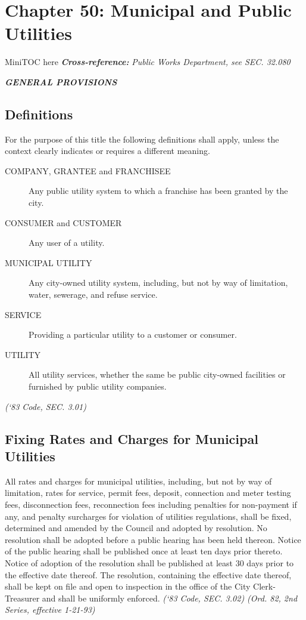 %
\chapter*{Chapter 50: \newline
	Municipal and Public Utilities}

MiniTOC here\newline
\textbf{\emph{{Cross-reference:}}}\newline
\emph{Public Works Department, see SEC. 32.080}
\pagebreak

\begin{center}
\textbf{\emph{\LARGE{GENERAL PROVISIONS}}}
\end{center}
\section{Definitions}
For the purpose of this title the following definitions shall apply, unless the context clearly indicates or requires a different meaning.
\begin{description}
\item[COMPANY, GRANTEE and FRANCHISEE] Any public utility system to which a franchise has been granted by the city.
\item[CONSUMER and CUSTOMER] Any user of a utility.
\item[MUNICIPAL UTILITY] Any city-owned utility system, including, but not by way of limitation, water, sewerage, and refuse service.
\item[SERVICE] Providing a particular utility to a customer or consumer.
\item[UTILITY] All utility services, whether the same be public city-owned facilities or furnished by public utility companies.
\end{description}
\emph{(‘83 Code, SEC. 3.01)}
\section{Fixing Rates and Charges for Municipal Utilities}
All rates and charges for municipal utilities, including, but not by way of limitation, rates for service, permit fees, deposit, connection and meter testing fees, disconnection fees, reconnection fees including penalties for non-payment if any, and penalty surcharges for violation of utilities regulations, shall be fixed, determined and amended by the Council and adopted by resolution.  No resolution shall be adopted before a public hearing has been held thereon.  Notice of the public hearing shall be published once at least ten days prior thereto.  Notice of adoption of the resolution shall be published at least 30 days prior to the effective date thereof.  The resolution, containing the effective date thereof, shall be kept on file and open to inspection in the office of the City Clerk-Treasurer and shall be uniformly enforced.\newline
\emph{(‘83 Code, SEC. 3.02) (Ord. 82, 2nd Series, effective 1-21-93)}
